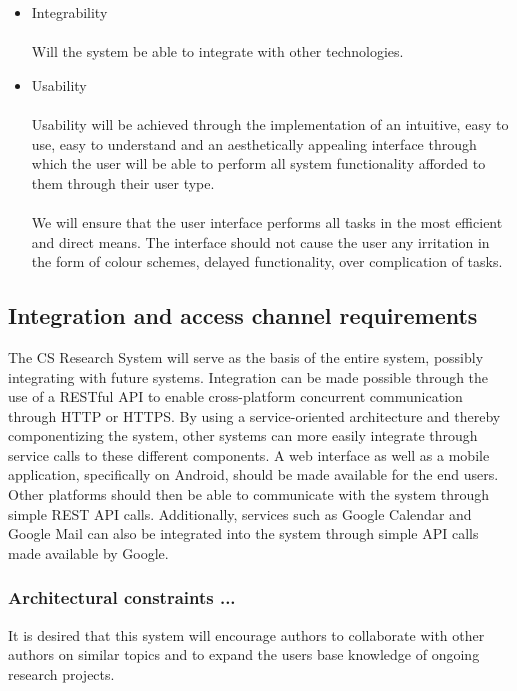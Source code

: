 \documentclass[a4paper]{article}
\begin{document}
\begin{itemize}
		        
		    \item Integrability \\\\
		        Will the system be able to integrate with other technologies.
		    \item Usability \\\\
		        Usability will be achieved through the implementation of an intuitive, easy to use, easy to understand and an aesthetically appealing interface through which the user will be able to perform all system functionality afforded to them through their user type.
		        \\\\
		        We will ensure that the user interface performs all tasks in the most efficient and direct means. The interface should not cause the user any irritation in the form of colour schemes, delayed functionality, over complication of tasks.
		 \end{itemize}
	

\subsection{Integration and access channel requirements}
    The CS Research System will serve as the basis of the entire system, possibly integrating with future systems. Integration can be made possible through the use of a RESTful API to enable cross-platform concurrent communication through HTTP or HTTPS. By using a service-oriented architecture and thereby componentizing the system, other systems can more easily integrate through service calls to these different components. A web interface as well as a mobile application, specifically on Android, should be made available for the end users. Other platforms should then be able to communicate with the system through simple REST API calls. Additionally, services such as Google Calendar and Google Mail can also be integrated into the system through simple API calls made available by Google. 
\\
    
\subsubsection{Architectural constraints ... }

   It is desired that this system will encourage authors to collaborate with other authors on similar topics and to expand the users base knowledge of ongoing research projects.
\\
    \\
    \\
    
\end{document}
